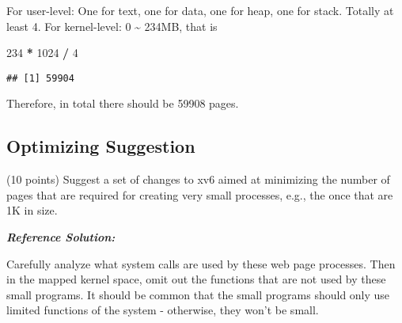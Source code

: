 \documentclass[]{article}
\newenvironment{Shaded}{\begin{snugshade}}{\end{snugshade}}
\newcommand{\DecValTok}[1]{\textcolor[rgb]{0.00,0.00,0.81}{#1}}
\newcommand{\OperatorTok}[1]{\textcolor[rgb]{0.81,0.36,0.00}{\textbf{#1}}}
\newcommand{\StringTok}[1]{\textcolor[rgb]{0.31,0.60,0.02}{#1}}
\begin{document}
For user-level: One for text, one for data, one for heap, one for stack.
Totally at least 4. For kernel-level: 0 \textasciitilde{} 234MB, that is

\begin{Shaded}
\begin{Highlighting}[]
\DecValTok{234} \OperatorTok{*}\StringTok{ }\DecValTok{1024} \OperatorTok{/}\StringTok{ }\DecValTok{4}
\end{Highlighting}
\end{Shaded}

\begin{verbatim}
## [1] 59904
\end{verbatim}

Therefore, in total there should be 59908 pages.

\hypertarget{optimizing-suggestion}{%
\subsection{Optimizing Suggestion}\label{optimizing-suggestion}}

(10 points) Suggest a set of changes to xv6 aimed at minimizing the
number of pages that are required for creating very small processes,
e.g., the once that are 1K in size.

\textbf{\emph{Reference Solution:}}

Carefully analyze what system calls are used by these web page
processes. Then in the mapped kernel space, omit out the functions that
are not used by these small programs. It should be common that the small
programs should only use limited functions of the system - otherwise,
they won't be small.
\end{document}
